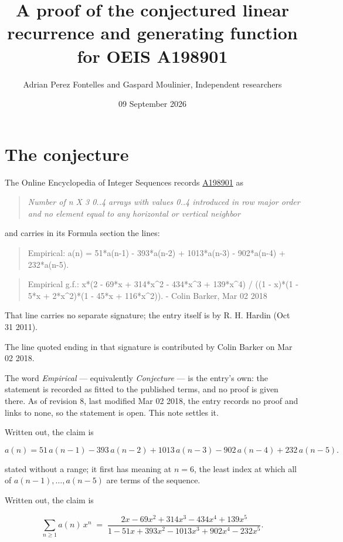 \documentclass[11pt]{article}
\title{A proof of the conjectured linear recurrence and generating function for OEIS A198901}
\author{Adrian Perez Fontelles and Gaspard Moulinier, Independent researchers}
\date{09 September 2026}
\theoremstyle{definition}
\begin{document}
\maketitle
\section{The conjecture}

The Online Encyclopedia of Integer Sequences records \href{https://oeis.org/A198901}{A198901} as

\begin{quote}\itshape Number of n X 3 0..4 arrays with values 0..4 introduced in row major order and no element equal to any horizontal or vertical neighbor\end{quote}

and carries in its Formula section the lines:

\begin{quote}\ttfamily Empirical: a(n) = 51*a(n-1) - 393*a(n-2) + 1013*a(n-3) - 902*a(n-4) + 232*a(n-5).\end{quote}

\begin{quote}\ttfamily Empirical g.f.: x*(2 - 69*x + 314*x\textasciicircum{}2 - 434*x\textasciicircum{}3 + 139*x\textasciicircum{}4) / ((1 - x)*(1 - 5*x + 2*x\textasciicircum{}2)*(1 - 45*x + 116*x\textasciicircum{}2)). - Colin Barker, Mar 02 2018\end{quote}

That line carries no separate signature; the entry itself is by R. H. Hardin (Oct 31 2011).

The line quoted ending in that signature is contributed by Colin Barker on Mar 02 2018.

The word {\itshape Empirical} --- equivalently {\itshape Conjecture} --- is the entry's own: the statement is recorded as fitted to the published terms, and no proof is given there. As of revision 8, last modified Mar 02 2018, the entry records no proof and links to none, so the statement is open. This note settles it.

Written out, the claim is

\[a(n) = 51\,a(n-1) - 393\,a(n-2) + 1013\,a(n-3) - 902\,a(n-4) + 232\,a(n-5).\]

stated without a range; it first has meaning at $n = 6$, the least index at which all of $a(n-1),\dots,a(n-5)$ are terms of the sequence.

Written out, the claim is

\[\sum_{n \ge 1} a(n)\,x^n \;=\; \frac{2x - 69x^{2} + 314x^{3} - 434x^{4} + 139x^{5}}{1 - 51x + 393x^{2} - 1013x^{3} + 902x^{4} - 232x^{5}}.\]
\end{document}
